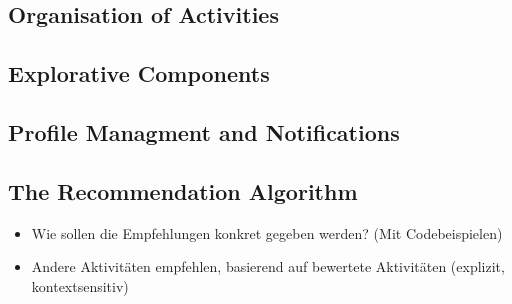 \documentclass[12pt,numbers=noenddot,parskip,bibliography=totocnumbered,listof=totocnumbered,draft=true]{scrreprt}
\begin{document}


\subsection{Organisation of Activities}

\subsection{Explorative Components}

\subsection{Profile Managment and Notifications}

\subsection{The Recommendation Algorithm}
\begin{itemize} 
	\item Wie sollen die Empfehlungen konkret gegeben werden? (Mit Codebeispielen)
	\item Andere Aktivitäten empfehlen, basierend auf bewertete Aktivitäten (explizit, kontextsensitiv)
\end{itemize} 
	
\end{document}
